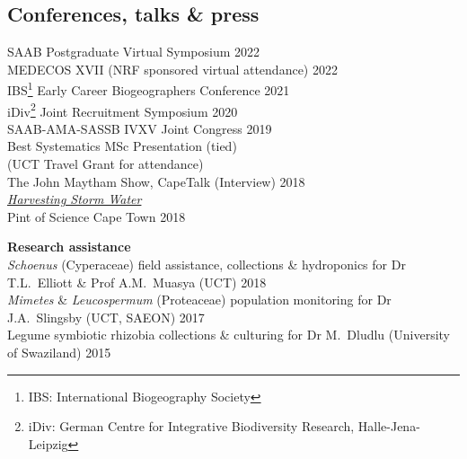 \documentclass[10pt]{article}
\begin{document}
\begin{multicols}{2}
\subsection*{Conferences, talks \& press} %

SAAB Postgraduate Virtual Symposium                      \hfill {\small 2022} \\
MEDECOS XVII {\small (NRF sponsored virtual attendance)} \hfill {\small 2022} \\
IBS\footnote{IBS: International Biogeography Society}
  Early Career Biogeographers Conference                 \hfill {\small 2021} \\
iDiv\footnote{iDiv: German Centre for Integrative
  Biodiversity Research, Halle-Jena-Leipzig} Joint
  Recruitment Symposium                                  \hfill {\small 2020} \\
SAAB-AMA-SASSB IVXV Joint Congress                       \hfill {\small 2019} \\
  \hspace{2em} {\small Best Systematics MSc Presentation
    (tied)}                                                                   \\
  \hspace{2em} {\small (UCT Travel Grant for attendance)}                     \\
The John Maytham Show, CapeTalk {\small (Interview)}     \hfill {\small 2018} \\
  \hspace{2em} {\small \href{https://www.capetalk.co.za/articles/328900/harvesting-stormwater-from-liesbeek-river-may-aid-ct-water-supply-students-find}
    {\textit{Harvesting Storm Water}}}                                        \\
Pint of Science Cape Town                                \hfill {\small 2018} \\

\end{multicols} %

\textbf{Research assistance} \\ %
\textit{Schoenus} (Cyperaceae)
  field assistance, collections \& hydroponics
  for Dr T.L.~Elliott \& Prof A.M.~Muasya
  {\small (UCT)}                                         \hfill {\small 2018} \\
\textit{Mimetes} \& \textit{Leucospermum} (Proteaceae)
  population monitoring
  for Dr J.A.~Slingsby
  {\small (UCT, SAEON)}                                  \hfill {\small 2017} \\
Legume symbiotic rhizobia
  collections \& culturing
  for Dr M.~Dludlu
  {\small (University of Swaziland)}                     \hfill {\small 2015} \\
\end{document}
